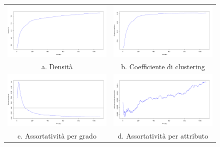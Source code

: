 \documentclass[a4paper,12pt]{article}
\begin{document}
\begin{figure}[h]
\begin{tabular}{cc}
  \includegraphics[width=81mm]{images/evolution_1000_rnd_1080_5_0.pdf} &   \includegraphics[width=81mm]{images/clustering_1000_rnd_1080_5_0.pdf} \\
a. Densità & b. Coefficiente di clustering \\[6pt]
 \includegraphics[width=81mm]{images/deg_assortativity_1000_rnd_1080_5_0.pdf} &   \includegraphics[width=81mm]{images/homophily_1000_rnd_1080_5_0.pdf} \\
c. Assortatività per grado & d. Assortatività per attributo \\[6pt]
\end{tabular}
\end{figure}
\end{document}

